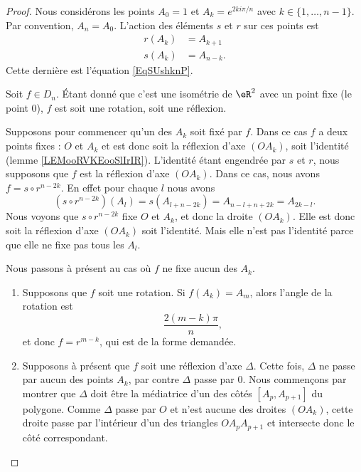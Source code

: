 \begin{proof}
	Nous considérons les points \( A_0=1\) et \( A_k= e^{2ki\pi/n}\) avec \( k\in\{ 1,\ldots, n-1 \}\). Par convention, \( A_n=A_0\). L'action des éléments \( s\) et \( r\) sur ces points est
	\begin{subequations}
		\begin{align}
			r(A_k) & =A_{k+1}  \\
			s(A_k) & =A_{n-k}.
		\end{align}
	\end{subequations}
	Cette dernière est l'équation \eqref{EqSUshknP}.

	Soit \( f\in D_n\). Étant donné que c'est une isométrie de \( \eR^2\) avec un point fixe (le point \( 0\)), \( f\) est soit une rotation, soit une réflexion.

	Supposons pour commencer qu'un des \( A_k\) soit fixé par \( f\). Dans ce cas \( f\) a deux points fixes : \( O\) et \( A_k\) et est donc soit la réflexion d'axe \( (OA_k)\), soit l'identité (lemme \ref{LEMooRVKEooSlIrIR}). L'identité étant engendrée par \( s\) et \( r\), nous supposons que \( f\) est la réflexion d'axe \( (OA_k)\). Dans ce cas, nous avons \( f=s\circ r^{n-2k}\). En effet pour chaque \( l\) nous avons
	\begin{equation}
		(s\circ r^{n-2k})(A_l)=s(A_{l+n-2k})=A_{n-l+n+2k}=A_{2k-l}.
	\end{equation}
	Nous voyons que \( s\circ r^{n-2k}\) fixe \( O\) et \( A_k\), et donc la droite \( (OA_k)\). Elle est donc soit la réflexion d'axe \( (OA_k)\) soit l'identité. Mais elle n'est pas l'identité parce que elle ne fixe pas tous les \( A_l\).

	Nous passons à présent au cas où \( f\) ne fixe aucun des \( A_k\).
	\begin{enumerate}
		\item
		      Supposons que \( f\) soit une rotation. Si \( f(A_k)=A_m\), alors l'angle de la rotation est
		      \begin{equation}
			      \frac{ 2(m-k)\pi }{ n },
		      \end{equation}
		      et donc \( f=r^{m-k}\), qui est de la forme demandée.
		\item
		      Supposons à présent que \( f\) soit une réflexion d'axe \( \Delta\). Cette fois, \( \Delta\) ne passe par aucun des points \( A_k\), par contre \( \Delta\) passe par \( 0\). Nous commençons par montrer que \( \Delta\) doit être la médiatrice d'un des côtés \( [A_p,A_{p+1}]\) du polygone. Comme \( \Delta\) passe par \( O\) et n'est aucune des droites \( (OA_k)\), cette droite passe par l'intérieur d'un des triangles \( OA_pA_{p+1}\) et intersecte donc le côté correspondant.


\end{enumerate}
\end{proof}
